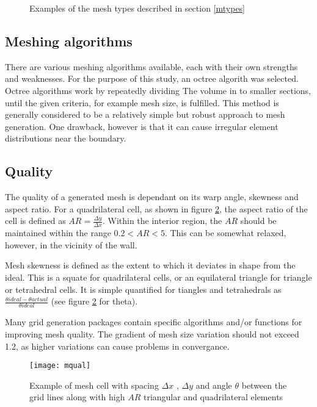 \begin{figure}

  \caption{Examples of the mesh types described in section \ref{mtypes}} \label{fig:struct}
\end{figure}

\subsection{Meshing algorithms}
There are various meshing algorithms available, each with their own strengths and weaknesses. For the purpose of this study, an octree algorith was selected. Octree algorithms work by repeatedly dividing The volume in to smaller sections, until the given criteria, for example mesh size, is fulfilled. This method is generally considered to be a relatively simple but robust approach to mesh generation. One drawback, however is that it can cause irregular element distributions near the boundary.

\subsection{Quality}

The quality of a generated mesh is dependant on its warp angle, skewness and aspect ratio. For a quadrilateral cell, as shown in figure \ref{fig:mqual}, the aspect ratio of the cell is defined as $AR = \frac{\Delta y} {\Delta x}$. Within the interior region, the $AR$ should be maintained within the range $0.2 < AR < 5$. This can be somewhat relaxed, however, in the vicinity of the wall.

Mesh skewness is defined as the extent to which it deviates in shape from the ideal. This is a squate for quadrilateral cells, or an equilateral triangle for triangle or tetrahedral cells. It is simple quantified for tiangles and tetrahedrals as $\frac{\theta ideal - \theta actual} {\theta ideal}$ (see figure \ref{fig:mqual} for theta).

Many grid generation packages contain specific algorithms and/or functions for improving mesh quality. The gradient of mesh size variation should not exceed 1.2, as higher variations can cause problems in convergance.

\begin{figure}
  \texttt{[image: mqual]}
  \caption{Example of mesh cell with spacing $\Delta x$ , $\Delta y$ and angle $ \theta $ between the grid lines along with high $AR$ triangular and quadrilateral elements } \label{fig:mqual}
\end{figure}

